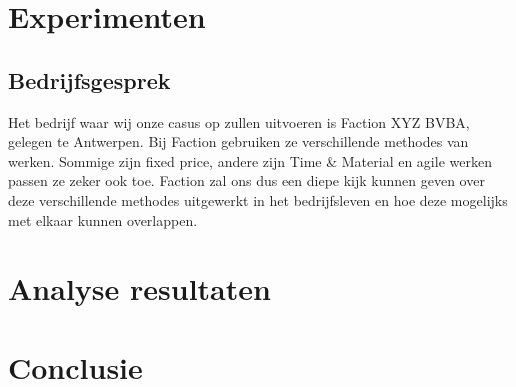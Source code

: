 \documentclass{hogent-article}
\begin{document}
	\section{Experimenten}
    \subsection{Bedrijfsgesprek}
    Het bedrijf waar wij onze casus op zullen uitvoeren is Faction XYZ BVBA, gelegen te Antwerpen. Bij Faction gebruiken ze verschillende methodes van werken. Sommige zijn fixed price, andere zijn Time \& Material en agile werken passen ze zeker ook toe. Faction zal ons dus een diepe kijk kunnen geven over deze verschillende methodes uitgewerkt in het bedrijfsleven en hoe deze mogelijks met elkaar kunnen overlappen.
	\section{Analyse resultaten}
	

	
	\section{Conclusie}
	

	
	
	\printbibliography[heading=bibintoc]
	
\end{document}
